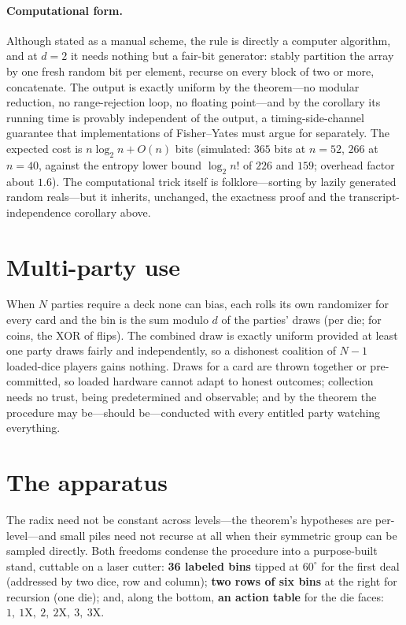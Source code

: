\documentclass[11pt]{article}
\begin{document}
\paragraph{Computational form.}
Although stated as a manual scheme, the rule is directly a computer
algorithm, and at $d = 2$ it needs nothing but a fair-bit generator:
stably partition the array by one fresh random bit per element, recurse
on every block of two or more, concatenate. The output is exactly
uniform by the theorem---no modular reduction, no range-rejection loop,
no floating point---and by the corollary its running time is provably
independent of the output, a timing-side-channel guarantee that
implementations of Fisher--Yates must argue for separately. The
expected cost is $n\log_2 n + O(n)$ bits (simulated: $365$ bits at
$n = 52$, $266$ at $n = 40$, against the entropy lower bound
$\log_2 n!$ of $226$ and $159$; overhead factor about $1.6$). The
computational trick itself is folklore---sorting by lazily generated
random reals---but it inherits, unchanged, the exactness proof and the
transcript-independence corollary above.

\section{Multi-party use}

When $N$ parties require a deck none can bias, each rolls its own
randomizer for every card and the bin is the sum modulo $d$ of the
parties' draws (per die; for coins, the XOR of flips). The combined draw
is exactly uniform provided at least one party draws fairly and
independently, so a dishonest coalition of $N-1$ loaded-dice players
gains nothing. Draws for a card are thrown together or pre-committed, so
loaded hardware cannot adapt to honest outcomes; collection needs no
trust, being predetermined and observable; and by the theorem the
procedure may be---should be---conducted with every entitled party
watching everything.

\section{The apparatus}

The radix need not be constant across levels---the theorem's hypotheses
are per-level---and small piles need not recurse at all when their
symmetric group can be sampled directly. Both freedoms condense the
procedure into a purpose-built stand, cuttable on a laser cutter:
\textbf{36 labeled bins} tipped at $60^\circ$ for the first deal
(addressed by two dice, row and column); \textbf{two rows of six
bins} at the right for recursion (one die); and, along the bottom,
\textbf{an action table} for the die faces:
$1,\ 1\mathrm{X},\ 2,\ 2\mathrm{X},\ 3,\ 3\mathrm{X}$.
\end{document}

